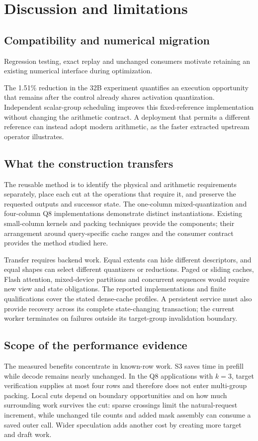 \section{Discussion and limitations}
\label{sec:discussion}

\subsection{Compatibility and numerical migration}
Regression testing, exact replay and unchanged consumers motivate retaining an existing numerical interface during optimization.

The 1.51\% reduction in the 32B experiment quantifies an execution opportunity that remains after the control already shares activation quantization. Independent scalar-group scheduling improves this fixed-reference implementation without changing the arithmetic contract. A deployment that permits a different reference can instead adopt modern arithmetic, as the faster extracted upstream operator illustrates.

\subsection{What the construction transfers}
The reusable method is to identify the physical and arithmetic requirements separately, place each cut at the operations that require it, and preserve the requested outputs and successor state. The one-column mixed-quantization and four-column Q8 implementations demonstrate distinct instantiations. Existing small-column kernels and packing techniques provide the components; their arrangement around query-specific cache ranges and the consumer contract provides the method studied here.

Transfer requires backend work. Equal extents can hide different descriptors, and equal shapes can select different quantizers or reductions. Paged or sliding caches, Flash attention, mixed-device partitions and concurrent sequences would require new view and state obligations. The reported implementations and finite qualifications cover the stated dense-cache profiles. A persistent service must also provide recovery across its complete state-changing transaction; the current worker terminates on failures outside its target-group invalidation boundary.

\subsection{Scope of the performance evidence}
The measured benefits concentrate in known-row work. S3 saves time in prefill while decode remains nearly unchanged. In the Q8 applications with $k=3$, target verification supplies at most four rows and therefore does not enter multi-group packing. Local cuts depend on boundary opportunities and on how much surrounding work survives the cut: sparse crossings limit the natural-request increment, while unchanged tile counts and added mask assembly can consume a saved outer call. Wider speculation adds another cost by creating more target and draft work.

